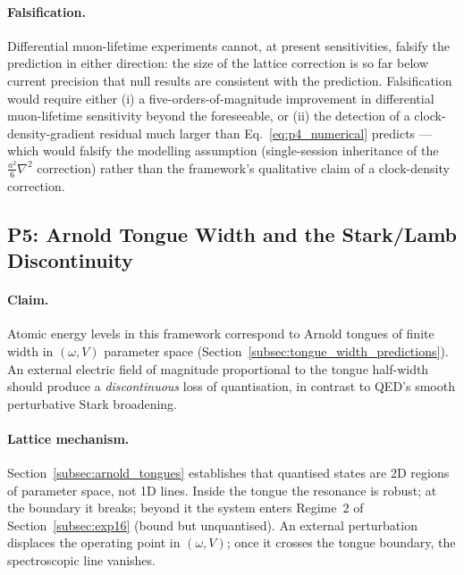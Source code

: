 \paragraph{Falsification.}
Differential muon-lifetime experiments cannot, at present sensitivities,
falsify the prediction in either direction: the size of the lattice
correction is so far below current precision that null results are
consistent with the prediction.  Falsification would require
either (i) a five-orders-of-magnitude improvement in differential
muon-lifetime sensitivity beyond the foreseeable, or (ii) the
detection of a clock-density-gradient residual much larger than
Eq.~\eqref{eq:p4_numerical} predicts --- which would falsify the
modelling assumption (single-session inheritance of the
$\frac{a^2}{6}\nabla^2$ correction) rather than the framework's
qualitative claim of a clock-density correction.

\subsection{P5: Arnold Tongue Width and the Stark/Lamb Discontinuity}
\label{subsec:p5_tongue_width}

\paragraph{Claim.}
Atomic energy levels in this framework correspond to Arnold tongues
of finite width in $(\omega, V)$ parameter space
(Section~\ref{subsec:tongue_width_predictions}). An external
electric field of magnitude proportional to the tongue half-width
should produce a \emph{discontinuous} loss of quantisation, in
contrast to QED's smooth perturbative Stark broadening.

\paragraph{Lattice mechanism.}
Section~\ref{subsec:arnold_tongues} establishes that quantised
states are 2D regions of parameter space, not 1D lines. Inside the
tongue the resonance is robust; at the boundary it breaks; beyond
it the system enters Regime~2 of Section~\ref{subsec:exp16} (bound
but unquantised). An external perturbation displaces the operating
point in $(\omega, V)$; once it crosses the tongue boundary, the
spectroscopic line vanishes.

